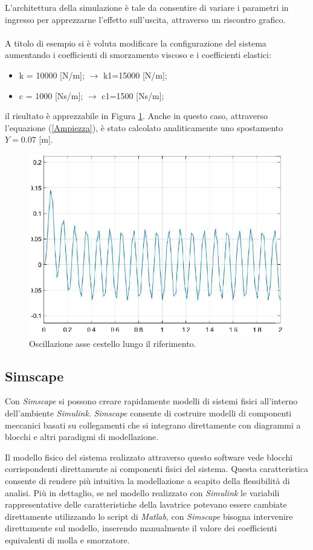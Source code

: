 L'architettura della simulazione è tale da consentire di variare i parametri in ingresso per apprezzarne l'effetto sull'uscita, attraverso un riscontro grafico.
\\\\
A titolo di esempio si è voluta modificare la configurazione del sistema aumentando i coefficienti di smorzamento viscoso e i coefficienti elastici:
\begin{itemize}
    \item k = 10000 [N/m]; $\to$ k1=15000 [N/m];
    \item c = 1000 [Ns/m]; $\to$ c1=1500 [Ns/m];
\end{itemize}
il risultato è apprezzabile in Figura \ref{SecondoPlot}. Anche in questo caso,  attraverso l'equazione (\ref{Ampiezza}), è stato calcolato analiticamente uno spostamento $Y=0.07$ [m].
\begin{figure}[h]
    \centering
    \includegraphics[scale=0.6]{Immagini/SecondoPlot.JPG}
    \caption{Oscillazione asse cestello lungo il riferimento.}
    \label{SecondoPlot}
\end{figure}
\subsection{Simscape}
Con \textit{Simscape} si possono creare rapidamente modelli di sistemi fisici all’interno dell’ambiente \textit{Simulink}. \textit{Simscape} consente di costruire modelli di componenti meccanici basati su collegamenti che si integrano direttamente con diagrammi a blocchi e altri paradigmi di modellazione. 

Il modello fisico del sistema realizzato attraverso questo software vede blocchi corrispondenti direttamente ai componenti fisici del sistema. Questa caratteristica consente di rendere più intuitiva la modellazione a scapito della flessibilità di analisi. Più in dettaglio, se nel modello realizzato con \textit{Simulink} le variabili rappresentative delle caratteristiche della lavatrice potevano essere cambiate direttamente utilizzando lo script di \textit{Matlab}, con \textit{Simscape} bisogna intervenire direttamente sul modello, inserendo manualmente il valore dei coefficienti equivalenti di molla e smorzatore. 
